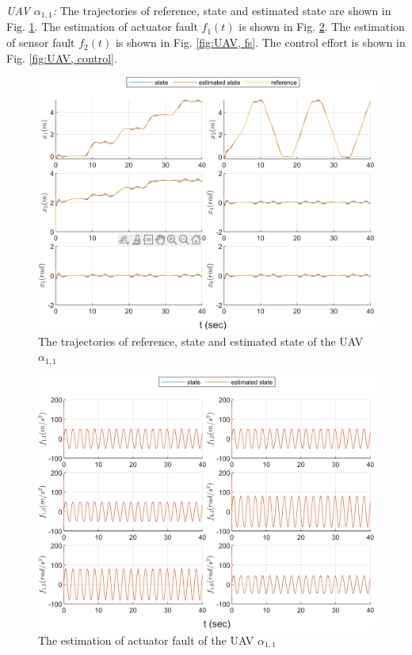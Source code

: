 \documentclass{ieeeaccess}
\begin{document}
\textit{UAV $\alpha_{1,1}$:}
The trajectories of reference, state and estimated state are shown in Fig. \ref{fig:UAV, state}. The estimation of actuator fault $f_1(t)$ is shown in Fig. \ref{fig:UAV, fa}. The estimation of sensor fault $f_2(t)$ is shown in Fig. \ref{fig:UAV, fs}. The control effort is shown in Fig. \ref{fig:UAV, control}.
\begin{figure}[htbp]
    \centering
    \includegraphics[scale=.57]{fig/uav (1).png}\caption{The trajectories of reference, state and estimated state of the UAV $\alpha_{1,1}$}%
    \label{fig:UAV, state}
\end{figure}
\begin{figure}[htbp]
    \centering
    \includegraphics[scale=.57]{fig/uav (2).png}\caption{The estimation of actuator fault of the UAV $\alpha_{1,1}$}
    \label{fig:UAV, fa}
\end{figure}
\end{document}
